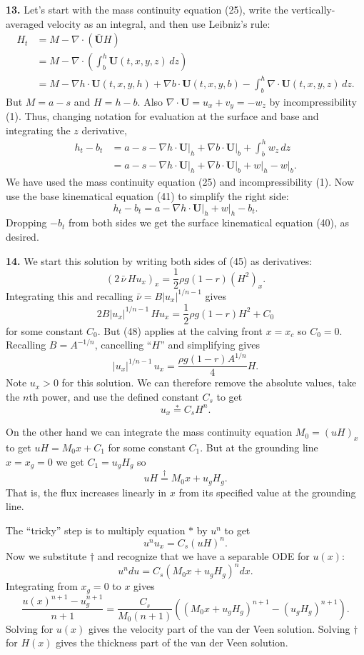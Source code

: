 \documentclass[10pt]{amsart}
\newcommand{\Div}{\nabla\cdot}
\newcommand{\grad}{\nabla}
\newcommand{\prob}[1]{\bigskip\noindent\large\textbf{#1.}\normalsize }
\begin{document}
\prob{13}  Let's start with the mass continuity equation (25), write the vertically-averaged velocity as an integral, and then use Leibniz's rule:
\begin{align*}
H_t &= M - \Div \left(\bar{\mathbf{U}} H \right) \\
    &= M - \Div \left(\int_b^h \mathbf{U}(t,x,y,z)\,dz\right) \\
    &= M - \grad h\cdot \mathbf{U}(t,x,y,h) + \grad b\cdot \mathbf{U}(t,x,y,b) - \int_b^h \Div \mathbf{U}(t,x,y,z)\,dz.
\end{align*}
But $M=a-s$ and $H=h-b$.  Also $\Div \mathbf{U} = u_x + v_y = - w_z$ by incompressibility (1).  Thus, changing notation for evaluation at the surface and base and integrating the $z$ derivative,
\begin{align*}
h_t - b_t &= a - s - \grad h\cdot \mathbf{U}\big|_h + \grad b\cdot \mathbf{U}\big|_b + \int_b^h w_z\,dz \\
    &= a - s - \grad h\cdot \mathbf{U}\big|_h + \grad b\cdot \mathbf{U}\big|_b + w\big|_h - w\big|_b.
\end{align*}
We have used the mass continuity equation (25) and incompressibility (1).  Now use the base kinematical equation (41) to simplify the right side:
  $$h_t - b_t = a - \grad h\cdot \mathbf{U}\big|_h + w\big|_h - b_t.$$
Dropping $-b_t$ from both sides we get the surface kinematical equation (40), as desired.

\prob{14}  We start this solution by writing both sides of (45) as derivatives:
    $$\left(2 \,\bar\nu\, H u_x\right)_x = \frac{1}{2} \rho g (1-r) (H^2)_x.$$
Integrating this and recalling $\bar\nu = B |u_x|^{1/n - 1}$ gives
    $$2 B |u_x|^{1/n - 1}\, H u_x = \frac{1}{2} \rho g (1-r) H^2 + C_0$$
for some constant $C_0$.  But (48) applies at the calving front $x=x_c$ so $C_0=0$.  Recalling $B=A^{-1/n}$, cancelling ``$H$'' and simplifying gives
    $$|u_x|^{1/n - 1}\, u_x = \frac{\rho g (1-r) A^{1/n}}{4} H.$$
Note $u_x>0$ for this solution.  We can therefore remove the absolute values, take the $n$th power, and use the defined constant $C_s$ to get
    $$u_x \stackrel{\ast}{=} C_s H^n.$$

On the other hand we can integrate the mass continuity equation $M_0=(uH)_x$ to get $uH = M_0 x + C_1$ for some constant $C_1$.  But at the grounding line $x=x_g=0$ we get $C_1 = u_g H_g$ so
    $$u H \stackrel{\dagger}{=} M_0 x + u_g H_g.$$
That is, the flux increases linearly in $x$ from its specified value at the grounding line.

The ``tricky'' step is to multiply equation $\ast$ by $u^n$ to get
    $$u^n u_x = C_s (uH)^n.$$
Now we substitute $\dagger$ and recognize that we have a separable ODE for $u(x)$:
    $$u^n du = C_s (M_0 x + u_g H_g)^n dx.$$
Integrating from $x_g=0$ to $x$ gives
    $$\frac{u(x)^{n+1}-u_g^{n+1}}{n+1} = \frac{C_s}{M_0 (n+1)} \left((M_0 x + u_g H_g)^{n+1} - (u_g H_g)^{n+1}\right).$$
Solving for $u(x)$ gives the velocity part of the van der Veen solution.  Solving $\dagger$ for $H(x)$ gives the thickness part of the van der Veen solution.
\end{document}
